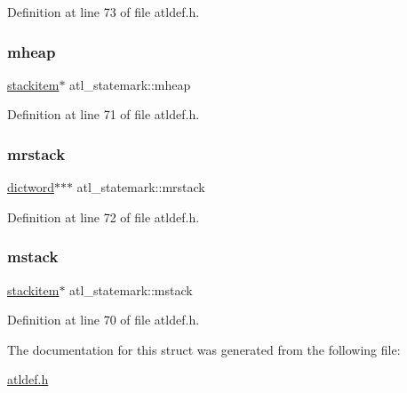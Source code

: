 Definition at line 73 of file atldef.\+h.

\mbox{\label{structatl__statemark_aba09067ebbeb5f98c1516fad2f164051}} 
\subsubsection{\texorpdfstring{mheap}{mheap}}
{\footnotesize\ttfamily \hyperlink{atldef_8h_aa59671df873ab6e8eef907b8b270c289}{stackitem}$\ast$ atl\+\_\+statemark\+::mheap}



Definition at line 71 of file atldef.\+h.

\mbox{\label{structatl__statemark_a5ac932fb973413078567978b4d86dc86}} 
\subsubsection{\texorpdfstring{mrstack}{mrstack}}
{\footnotesize\ttfamily \hyperlink{atldef_8h_ae7377e5eb7d9a7da50cd10838d479299}{dictword}$\ast$$\ast$$\ast$ atl\+\_\+statemark\+::mrstack}



Definition at line 72 of file atldef.\+h.

\mbox{\label{structatl__statemark_a7030bfc0e475cd34bd0c33a4808b8ab0}} 
\subsubsection{\texorpdfstring{mstack}{mstack}}
{\footnotesize\ttfamily \hyperlink{atldef_8h_aa59671df873ab6e8eef907b8b270c289}{stackitem}$\ast$ atl\+\_\+statemark\+::mstack}



Definition at line 70 of file atldef.\+h.



The documentation for this struct was generated from the following file\+:\begin{DoxyCompactItemize}
\item 
\hyperlink{atldef_8h}{atldef.\+h}\end{DoxyCompactItemize}

